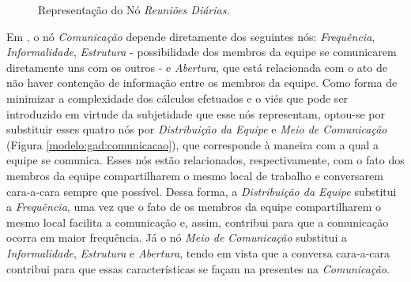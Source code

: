 \begin{figure}[ht!]
\begin{center}
	\end{center}
	\caption{Representação do Nó \textit{Reuniões Diárias}.}
	\label{modelo:gad:reunioes}
\end{figure}

Em \cite{freire}, o nó \textit{Comunicação} depende diretamente dos seguintes nós: \textit{Frequência}, \textit{Informalidade}, \textit{Estrutura} - possibilidade dos membros da equipe se comunicarem diretamente uns com os outros - e \textit{Abertura}, que está relacionada com o ato de não haver contenção de informação entre os membros da equipe. Como forma de minimizar a complexidade dos cálculos efetuados \cite{bengal} e o viés que pode ser introduzido em virtude da subjetidade que esse nós representam, optou-se por substituir esses quatro nós por \textit{Distribuição da Equipe} e \textit{Meio de Comunicação} (Figura \ref{modelo:gad:comunicacao}), que corresponde à maneira com a qual a equipe se comunica. Esses nós estão relacionados, respectivamente, com o fato dos membros da equipe compartilharem o mesmo local de trabalho e conversarem cara-a-cara sempre que possível. Dessa forma, a \textit{Distribuição da Equipe} substitui a \textit{Frequência}, uma vez que o fato de os membros da equipe compartilharem o mesmo local facilita a comunicação \cite{lalsing} e, assim, contribui para que a comunicação ocorra em maior frequência. Já o nó \textit{Meio de Comunicação} substitui a \textit{Informalidade}, \textit{Estrutura} e \textit{Abertura}, tendo em vista que a conversa cara-a-cara contribui para que essas características se façam na presentes na \textit{Comunicação}.


